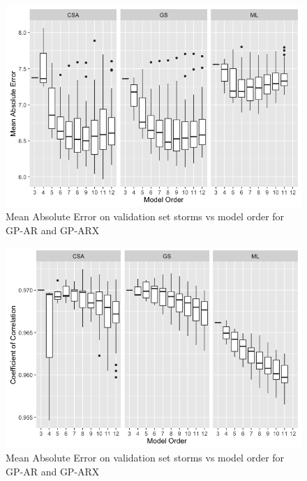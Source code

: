 \documentclass[sw, draft]{AGUTeX}
\begin{document}
\begin{figure}
\noindent\includegraphics[width=\textwidth]{Compare-mae-arx.png}
\caption{Mean Absolute Error on validation set storms vs model order for GP-AR and GP-ARX}
\label{fig:CompareMaeARX}
\end{figure}

\begin{figure}
\noindent\includegraphics[width=\textwidth]{Compare-cc-arx.png}
\caption{Mean Absolute Error on validation set storms vs model order for GP-AR and GP-ARX}
\label{fig:CompareCCARX}
\end{figure}
\end{document}
